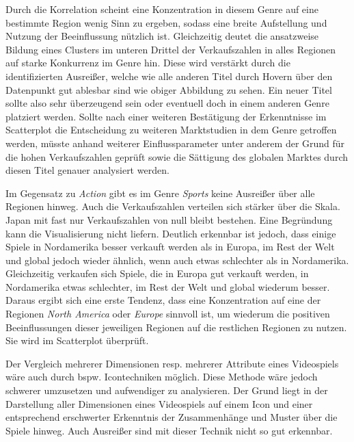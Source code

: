 \documentclass[usegeometry=true]{scrartcl}
\begin{document}
Durch die Korrelation scheint eine Konzentration in diesem Genre auf eine bestimmte Region wenig Sinn zu ergeben, sodass eine breite Aufstellung und Nutzung der Beeinflussung nützlich ist.
Gleichzeitig deutet die ansatzweise Bildung eines Clusters im unteren Drittel der Verkaufszahlen in alles Regionen auf starke Konkurrenz im Genre hin. 
Diese wird verstärkt durch die identifizierten Ausreißer, welche wie alle anderen Titel durch Hovern über den Datenpunkt gut ablesbar sind wie obiger Abbildung zu sehen.
Ein neuer Titel sollte also sehr überzeugend sein oder eventuell doch in einem anderen Genre platziert werden. 
Sollte nach einer weiteren Bestätigung der Erkenntnisse im Scatterplot die Entscheidung zu weiteren Marktstudien in dem Genre getroffen werden, müsste anhand weiterer Einflussparameter unter anderem der Grund für die hohen Verkaufszahlen geprüft sowie die Sättigung des globalen Marktes durch diesen Titel genauer analysiert werden.

Im Gegensatz zu \textit{Action} gibt es im Genre \textit{Sports} keine Ausreißer über alle Regionen hinweg. Auch die Verkaufszahlen verteilen sich stärker über die Skala. 
Japan mit fast nur Verkaufszahlen von null bleibt bestehen. Eine Begründung kann die Visualisierung nicht liefern.
Deutlich erkennbar ist jedoch, dass einige Spiele in Nordamerika besser verkauft werden als in Europa, im Rest der Welt und global jedoch wieder ähnlich, wenn auch etwas schlechter als in Nordamerika. 
Gleichzeitig verkaufen sich Spiele, die in Europa gut verkauft werden, in Nordamerika etwas schlechter, im Rest der Welt und global wiederum besser. 
Daraus ergibt sich eine erste Tendenz, dass eine Konzentration auf eine der Regionen \textit{North America} oder \textit{Europe} sinnvoll ist, um wiederum die positiven Beeinflussungen dieser jeweiligen Regionen auf die restlichen Regionen zu nutzen. 
Sie wird im Scatterplot überprüft.

Der Vergleich mehrerer Dimensionen resp. mehrerer Attribute eines Videospiels wäre auch durch bspw. Icontechniken möglich. 
Diese Methode wäre jedoch schwerer umzusetzen und aufwendiger zu analysieren. 
Der Grund liegt in der Darstellung aller Dimensionen eines Videospiels auf einem Icon und einer entsprechend erschwerter Erkenntnis der Zusammenhänge und Muster über die Spiele hinweg. 
Auch Ausreißer sind mit dieser Technik nicht so gut erkennbar.

\end{document}
